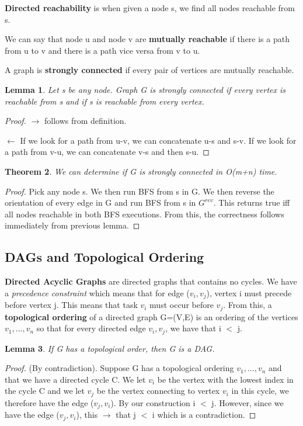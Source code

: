 \documentclass[11pt, oneside]{article}
\newtheorem{theorem}{Theorem}
\newtheorem{lemma}[theorem]{Lemma}
\theoremstyle{definition}
\begin{document}
\textbf{Directed reachability} is when given a node s, we find all nodes reachable from s.

We can say that node u and node v are \textbf{mutually reachable} if there is a path from u to v and there is a path vice versa from v to u.

A graph is \textbf{strongly connected} if every pair of vertices are mutually reachable.

\begin{lemma}
  Let s be any node. Graph G is strongly connected if every vertex is reachable from s and if s is reachable from every vertex.
\end{lemma}
\begin{proof}
  $\rightarrow$ follows from definition.

  $\leftarrow$ If we look for a path from u-v, we can concatenate u-s and s-v. If we look for a path from v-u, we can concatenate v-s and then s-u.
\end{proof}

\begin{theorem}
  We can determine if G is strongly connected in O(m+n) time.
\end{theorem}
\begin{proof}
  Pick any node s. We then run BFS from s in G. We then reverse the orientation of every edge in G and run BFS from s in $G^{rev}$. This returns true iff all nodes reachable in both BFS executions. From this, the correctness follows immediately from previous lemma.
\end{proof}

\subsection{DAGs and Topological Ordering}
\textbf{Directed Acyclic Graphs} are directed graphs that contains no cycles. We have a \textit{precedence constraint} which means that for edge ($v_i, v_j$), vertex i must precede before vertex j. This means that task $v_i$ must occur before $v_j$. From this, a \textbf{topological ordering} of a directed graph G=(V,E) is an ordering of the vertices $v_1,...,v_n$ so that for every directed edge $v_i, v_j$, we have that i $<$ j.

\begin{lemma}
  If G has a topological order, then G is a DAG.
\end{lemma}
\begin{proof}
  (By contradiction). Suppose G has a topological ordering $v_1,...,v_n$ and that we have a directed cycle C. We let $v_i$ be the vertex with the lowest index in the cycle C and we let $v_j$ be the vertex connecting to vertex $v_i$ in this cycle, we therefore have the edge ($v_j, v_i$). By our construction i $<$ j. However, since we have the edge ($v_j, v_i$), this $\rightarrow$ that j $<$ i which is a contradiction.
\end{proof}
\end{document}
